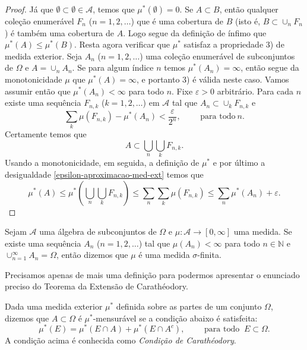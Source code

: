 \begin{proof}
Já que $\emptyset\subset \emptyset \in \mathcal{A}$, temos que $\mu^{*}(\emptyset)=0$.
Se $A\subset B$, então qualquer coleção enumerável $F_n$ ($n=1,2,\ldots$) que é uma 
cobertura de $B$ (isto é, $B\subset \cup_n F_n$) é também uma cobertura de $A$.
Logo segue da definição de ínfimo que $\mu^{*}(A)\leq \mu^{*}(B)$.
Resta agora verificar que $\mu^{*}$ satisfaz a propriedade 3) de medida exterior.
Seja $A_n$ ($n=1,2,\ldots$) uma coleção enumerável de subconjuntos de $\Omega$
e $A=\cup_n A_n$. Se para algum índice $n$ temos $\mu^{*}(A_n)=\infty$,
então segue da monotonicidade $\mu$ que $\mu^{*}(A)=\infty$, e portanto 
3) é válida neste caso. Vamos assumir então que $\mu^{*}(A_n)<\infty$ 
para todo $n$. Fixe $\varepsilon>0$ arbitrário. Para cada $n$ existe
uma sequência $F_{n,k}$ ($k=1,2,\ldots$) em $\mathcal{A}$ tal que 
$A_n\subset \cup _k F_{n,k}$ e 
\begin{equation}\label{epsilon-aproximacao-med-ext}
\sum_k \mu(F_{n,k}) -\mu^{*}(A_n) < \frac{\varepsilon}{2^n},
\qquad
\text{ para todo}\ n.
\end{equation}
Certamente temos que 
$$
A\subset \bigcup_{n}\bigcup_{k} F_{n,k}.
$$
Usando a monotonicidade, em seguida, a definição de $\mu^{*}$ e por 
último a desigualdade \eqref{epsilon-aproximacao-med-ext} temos que
$$
\mu^{*}(A)
\leq 
\mu^{*}\left( \bigcup_{n}\bigcup_{k} F_{n,k} \right)
\leq
\sum_{n}\sum_{k} \mu(F_{n,k})
\leq \sum_{n}\mu^{*}(A_n) +\varepsilon.
$$
\end{proof}
 
 

\begin{definicao}
	Sejam $\mathcal{A}$ uma álgebra de subconjuntos de $\Omega$ e 
	$\mu:\mathcal{A}\to [0,\infty]$ uma medida.
	Se existe uma sequência $A_n$ ($n=1,2,\ldots$) tal que $\mu(A_n)<\infty$ 
	para todo $n\in\mathbb{N}$ e $\cup_{n=1}^{\infty}A_n =\Omega$, então 
	dizemos que $\mu$ é uma medida $\sigma$-finita.
\end{definicao} 
 
Precisamos apenas de mais uma definição para podermos apresentar o enunciado
preciso do Teorema da Extensão de Carathéodory.




\begin{definicao}
Dada uma medida exterior $\mu^{*}$ definida sobre as partes de um conjunto $\Omega$,
dizemos que $A\subset \Omega$ é $\mu^{*}$-mensurável se a condição abaixo é satisfeita:
\begin{equation}\label{cond-caratheodory}
\mu^{*}(E) = \mu^*(E\cap A) + \mu^*(E\cap A^c),
\qquad
\text{ para todo } \ E\subset\Omega.
\end{equation}
A condição acima é conhecida como {\it Condição de Carathéodory}.
\end{definicao}





